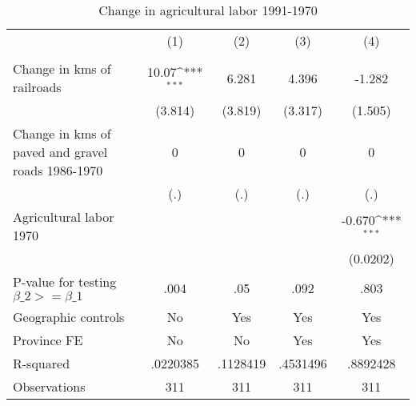 \begin{table}[htbp]\centering
\def\sym#1{\ifmmode^{#1}\else\(^{#1}\)\fi}
\caption{Change in agricultural labor 1991-1970}
\begin{tabular}{l*{4}{c}}
\hline\hline
                &\multicolumn{1}{c}{(1)}&\multicolumn{1}{c}{(2)}&\multicolumn{1}{c}{(3)}&\multicolumn{1}{c}{(4)}\\
                &\multicolumn{1}{c}{}&\multicolumn{1}{c}{}&\multicolumn{1}{c}{}&\multicolumn{1}{c}{}\\
\hline
Change in kms of railroads&    10.07\sym{***}&    6.281         &    4.396         &   -1.282         \\
                &  (3.814)         &  (3.819)         &  (3.317)         &  (1.505)         \\
[1em]
Change in kms of paved and gravel roads 1986-1970&        0         &        0         &        0         &        0         \\
                &      (.)         &      (.)         &      (.)         &      (.)         \\
[1em]
Agricultural labor 1970&                  &                  &                  &   -0.670\sym{***}\\
                &                  &                  &                  & (0.0202)         \\
\hline
P-value for testing $\beta\_{2} >= \beta\_{1}$&     .004         &      .05         &     .092         &     .803         \\
Geographic controls&       No         &      Yes         &      Yes         &      Yes         \\
Province FE     &       No         &       No         &      Yes         &      Yes         \\
R-squared       & .0220385         & .1128419         & .4531496         & .8892428         \\
Observations    &      311         &      311         &      311         &      311         \\
\hline\hline
\end{tabular}
\end{table}
